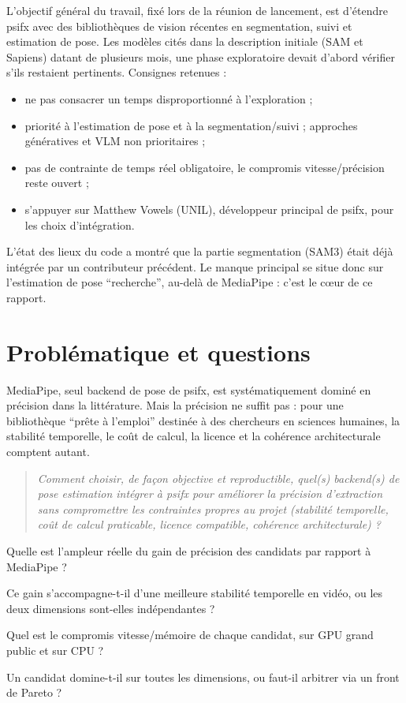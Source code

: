 \documentclass[11pt,a4paper]{report}
\begin{document}
L'objectif général du travail, fixé lors de la réunion de lancement, est d'étendre psifx avec des bibliothèques de
vision récentes en segmentation, suivi et estimation de pose. Les modèles cités dans la description initiale (SAM
et Sapiens) datant de plusieurs mois, une phase exploratoire devait d'abord vérifier s'ils restaient pertinents.
Consignes retenues :
\begin{itemize}
    \item ne pas consacrer un temps disproportionné à l'exploration ;
    \item priorité à l'estimation de pose et à la segmentation/suivi ; approches génératives et VLM non prioritaires ;
    \item pas de contrainte de temps réel obligatoire, le compromis vitesse/précision reste ouvert ;
    \item s'appuyer sur Matthew Vowels (UNIL), développeur principal de psifx, pour les choix d'intégration.
\end{itemize}

L'état des lieux du code a montré que la partie segmentation (SAM3) était déjà intégrée par un contributeur
précédent. Le manque principal se situe donc sur l'estimation de pose \enquote{recherche}, au-delà de MediaPipe :
c'est le cœur de ce rapport.

\section{Problématique et questions}

MediaPipe, seul backend de pose de psifx, est systématiquement dominé en précision dans la littérature. Mais la
précision ne suffit pas : pour une bibliothèque \enquote{prête à l'emploi} destinée à des chercheurs en sciences
humaines, la stabilité temporelle, le coût de calcul, la licence et la cohérence architecturale comptent autant.

\begin{quote}
\emph{Comment choisir, de façon objective et reproductible, quel(s) backend(s) de pose estimation intégrer à psifx
pour améliorer la précision d'extraction sans compromettre les contraintes propres au projet (stabilité temporelle,
coût de calcul praticable, licence compatible, cohérence architecturale) ?}
\end{quote}

\begin{description}[leftmargin=1.2cm]
    \item[Q1] Quelle est l'ampleur réelle du gain de précision des candidats par rapport à MediaPipe ?
    \item[Q2] Ce gain s'accompagne-t-il d'une meilleure stabilité temporelle en vidéo, ou les deux dimensions
    sont-elles indépendantes ?
    \item[Q3] Quel est le compromis vitesse/mémoire de chaque candidat, sur GPU grand public et sur CPU ?
    \item[Q4] Un candidat domine-t-il sur toutes les dimensions, ou faut-il arbitrer via un front de Pareto ?
\end{description}
\end{document}
